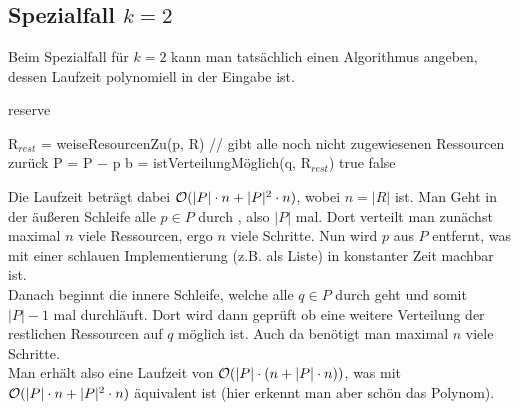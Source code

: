 \documentclass[a4paper]{article}
\begin{document}
	\maketitle
	\section{}
		\subsection{}
		\subsection{Spezialfall $k=2$}
			Beim Spezialfall für $k=2$ kann man tatsächlich einen Algorithmus angeben, dessen Laufzeit polynomiell in der Eingabe ist.
		\begin{breakablealgorithm}
			\caption{reserve}
			\begin{algorithmic}[1]
						\State R$_{rest}$ = weiseResourcenZu(p, R) // gibt alle noch nicht zugewiesenen Ressourcen zurück
						\State P = P $-$ p
							\State b = istVerteilungMöglich(q, R$_{rest}$)
								\Return true
							\EndIf
						\EndFor
					\EndFor
					\Return false
				\EndProcedure
			\end{algorithmic}
		\end{breakablealgorithm}
		Die Laufzeit beträgt dabei $\mathcal{O}(|P|\cdot n+|P|^2\cdot n)$, wobei $n=|R|$ ist.\n
		Man Geht in der äußeren Schleife alle $p\in P$ durch , also $|P|$ mal. Dort verteilt man zunächst maximal $n$ viele Ressourcen, ergo $n$ viele Schritte. Nun wird $p$ aus $P$ entfernt, was mit einer schlauen Implementierung (z.B. als Liste) in konstanter Zeit machbar ist.\\
		Danach beginnt die innere Schleife, welche alle $q\in P$ durch geht und somit $|P|-1$ mal durchläuft. Dort wird dann geprüft ob eine weitere Verteilung der restlichen Ressourcen auf $q$ möglich ist. Auch da benötigt man maximal $n$ viele Schritte.\\
		Man erhält also eine Laufzeit von $\mathcal{O}(|P|\cdot(n+|P|\cdot n))$, was mit $\mathcal{O}(|P|\cdot n+|P|^2\cdot n)$ äquivalent ist (hier erkennt man aber schön das Polynom).
		\subsection{}
		\subsection{}
	\section{}
		\subsection{}
		\subsection{}
\end{document}
